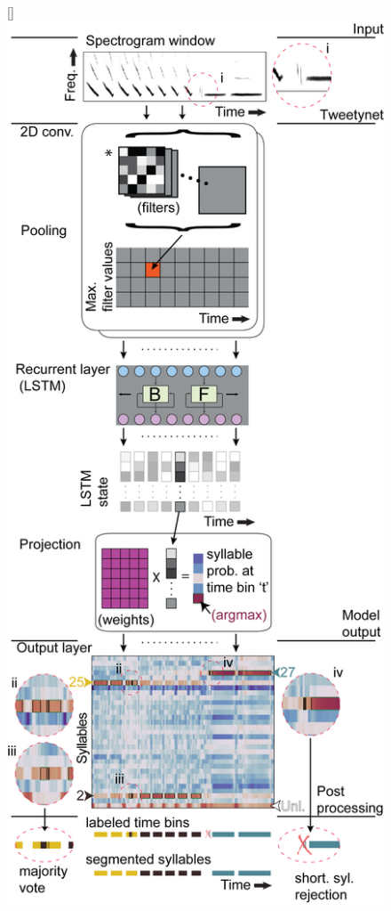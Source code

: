 \documentclass[10pt,letterpaper]{article}
\begin{document}
\begin{figure}[!ht]
[\FBwidth]
{\includegraphics[scale=0.66]{figures/mainfig_tweetynet_architecture_and_basic_operation/mainfig_tweetynet_architecture_operations_and_post_processing.png}}

\end{figure}
\end{document}
